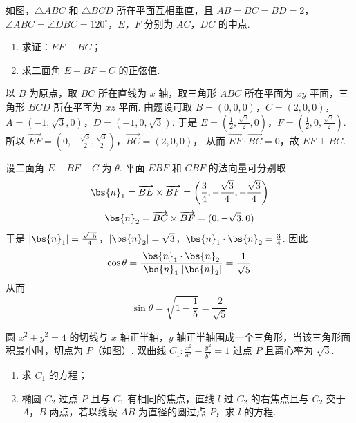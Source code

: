\begin{problem}
如图，\(\triangle ABC\) 和 \(\triangle BCD\) 所在平面互相垂直，且 \(AB = BC = BD = 2\)，\(\angle ABC = \angle DBC = 120^{\circ}\)，\(E\)，\(F\) 分别为 \(AC\)，\(DC\) 的中点.

\begin{enumerate}
\item 求证：\(EF \perp BC\)；
\item 求二面角 \(E - BF - C\) 的正弦值.
\end{enumerate}

\end{problem}

\begin{solution}
以 \(B\) 为原点，取 \(BC\) 所在直线为 \(x\) 轴，取三角形 \(ABC\) 所在平面为 \(xy\) 平面，三角形 \(BCD\) 所在平面为 \(xz\) 平面. 由题设可取
\(B=(0,0,0)\)，\(C=(2,0,0)\)，\(A=(-1,\sqrt3,0)\)，\(D=(-1,0,\sqrt3)\).
于是
\(E=\left(\frac12,\frac{\sqrt3}{2},0\right)\)，\(F=\left(\frac12,0,\frac{\sqrt3}{2}\right)\).
所以
\(\overrightarrow{EF}=\left(0,-\frac{\sqrt3}{2},\frac{\sqrt3}{2}\right)\)，\(\overrightarrow{BC}=(2,0,0)\)，
从而 \(\overrightarrow{EF}\cdot\overrightarrow{BC}=0\)，故 \(EF\perp BC\).

设二面角 \(E-BF-C\) 为 \(\theta\). 平面 \(EBF\) 和 \(CBF\) 的法向量可分别取
\[
\bs{n}_1=\overrightarrow{BE}\times\overrightarrow{BF}
=\left(\frac34,-\frac{\sqrt3}{4},-\frac{\sqrt3}{4}\right)
\]
\[
\bs{n}_2=\overrightarrow{BC}\times\overrightarrow{BF}=(0,-\sqrt3,0)
\]
于是
\(\lvert\bs{n}_1\rvert=\frac{\sqrt{15}}4\)，\(\lvert\bs{n}_2\rvert=\sqrt3\)，\(\bs{n}_1\cdot\bs{n}_2=\frac34\).
因此
\[
\cos\theta=\frac{\bs{n}_1\cdot\bs{n}_2}{\lvert\bs{n}_1\rvert\lvert\bs{n}_2\rvert}=\frac1{\sqrt5}
\]
从而
\[
\sin\theta=\sqrt{1-\frac15}=\frac2{\sqrt5}
\]
\end{solution}

\begin{problem}
圆 \(x^{2} + y^{2} = 4\) 的切线与 \(x\) 轴正半轴，\(y\) 轴正半轴围成一个三角形，当该三角形面积最小时，切点为 \(P\)（如图）. 双曲线 \(C_{1}: \frac{x^{2}}{a^{2}} - \frac{y^{2}}{b^{2}} = 1\) 过点 \(P\) 且离心率为 \(\sqrt{3}\).
\begin{enumerate}
\item 求 \(C_1\) 的方程；
\item 椭圆 \(C_2\) 过点 \(P\) 且与 \(C_1\) 有相同的焦点，直线 \(l\) 过 \(C_2\) 的右焦点且与 \(C_2\) 交于 \(A\)，\(B\) 两点，若以线段 \(AB\) 为直径的圆过点 \(P\)，求 \(l\) 的方程.
\end{enumerate}

\end{problem}

